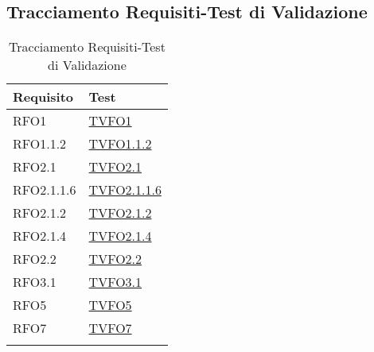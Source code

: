 \subsection{Tracciamento Requisiti-Test di Validazione}
\normalsize
\begin{longtable}{|>{\centering}m{5cm}|m{5cm}<{\centering}|}
\hline 
\textbf{Requisito} & \textbf{Test}\\
\hline
\endhead
RFO1 & \hyperlink{TVFO1}{TVFO1}\\ \hline
RFO1.1.2 & \hyperlink{TVFO1.1.2}{TVFO1.1.2}\\ \hline
RFO2.1 & \hyperlink{TVFO2.1}{TVFO2.1}\\ \hline
RFO2.1.1.6 & \hyperlink{TVFO2.1.1.6}{TVFO2.1.1.6}\\ \hline
RFO2.1.2 & \hyperlink{TVFO2.1.2}{TVFO2.1.2}\\ \hline
RFO2.1.4 & \hyperlink{TVFO2.1.4}{TVFO2.1.4}\\ \hline
RFO2.2 & \hyperlink{TVFO2.2}{TVFO2.2}\\ \hline
RFO3.1 & \hyperlink{TVFO3.1}{TVFO3.1}\\ \hline
RFO5 & \hyperlink{TVFO5}{TVFO5}\\ \hline
RFO7 & \hyperlink{TVFO7}{TVFO7}\\ \hline
\caption[Tracciamento Requisiti-Test di Validazione]{Tracciamento Requisiti-Test di Validazione}
\label{tabella:requi-tv}
\end{longtable}
\clearpage
